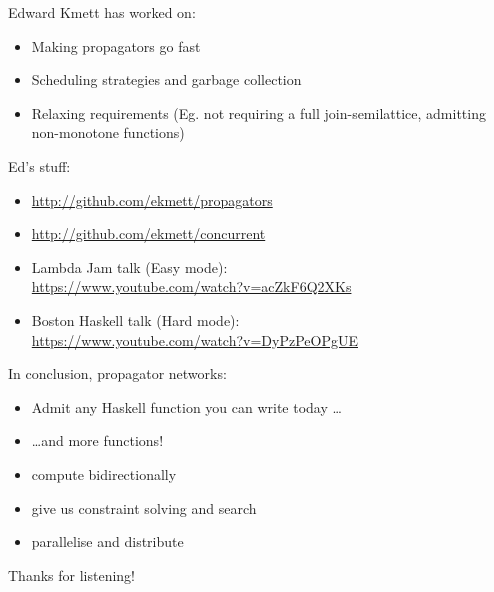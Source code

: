 \documentclass[usenames,dvipsnames,svgnames,table,aspectratio=1610,mathserif]{beamer}
\newcommand{\textslide}[1]{{
\begin{frame}
\begin{center}

#1

\end{center}
\end{frame}
}}
\newcommand{\textslideleft}[1]{{
\begin{frame}

#1

\end{frame}
}}
\begin{document}
\textslideleft{
Edward Kmett has worked on:

\begin{itemize}
\item Making propagators go fast
\item Scheduling strategies and garbage collection
\item Relaxing requirements (Eg. not requiring a full join-semilattice, admitting non-monotone functions)
\end{itemize}

Ed's stuff:
\begin{itemize}
\item \url{http://github.com/ekmett/propagators}
\item \url{http://github.com/ekmett/concurrent}
\item Lambda Jam talk (Easy mode): \\
      \url{https://www.youtube.com/watch?v=acZkF6Q2XKs}
\item Boston Haskell talk (Hard mode): \\
      \url{https://www.youtube.com/watch?v=DyPzPeOPgUE}

\end{itemize}
}

\textslideleft{

In conclusion, propagator networks:

\begin{itemize}
\item Admit any Haskell function you can write today \ldots
\item \ldots and more functions!
\item compute bidirectionally
\item give us constraint solving and search
\item parallelise and distribute
\end{itemize}
}

%
%


\textslide{\Large{Thanks for listening!}}
\end{document}
